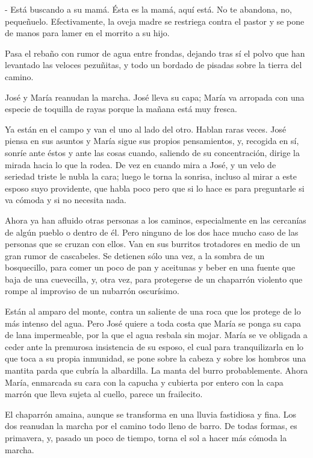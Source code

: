 \documentclass[12pt, twoside, openright]{book} %
\begin{document}
- Está buscando a su mamá. Ésta es la mamá, aquí está. No te abandona, no, pequeñuelo. Efectivamente, la oveja madre se restriega contra el pastor y se pone de manos para lamer en el morrito a su hijo. 

Pasa el rebaño con rumor de agua entre frondas, dejando tras sí el polvo que han levantado las veloces pezuñitas, y todo un bordado de pisadas sobre la tierra del camino. 

José y María reanudan la marcha. José lleva su capa; María va arropada con una especie de toquilla de rayas porque la mañana está muy fresca. 

Ya están en el campo y van el uno al lado del otro. Hablan raras veces. José piensa en sus asuntos y María sigue sus propios pensamientos, y, recogida en sí, sonríe ante éstos y ante las cosas cuando, saliendo de su concentración, dirige la mirada hacia lo que la rodea. De vez en cuando mira a José, y un velo de seriedad triste le nubla la cara; luego le torna la sonrisa, incluso al mirar a este esposo suyo providente, que habla poco pero que si lo hace es para preguntarle si va cómoda y si no necesita nada. 

Ahora ya han afluido otras personas a los caminos, especialmente en las cercanías de algún pueblo o dentro de él. Pero ninguno de los dos hace mucho caso de las personas que se cruzan con ellos. Van en sus burritos trotadores en medio de un gran rumor de cascabeles. Se detienen sólo una vez, a la sombra de un bosquecillo, para comer un poco de pan y aceitunas y beber en una fuente que baja de una cuevecilla, y, otra vez, para protegerse de un chaparrón violento que rompe al improviso de un nubarrón oscurísimo. 

Están al amparo del monte, contra un saliente de una roca que los protege de lo más intenso del agua. Pero José quiere a toda costa que María se ponga su capa de lana impermeable, por la que el agua resbala sin mojar. María se ve obligada a ceder ante la premurosa insistencia de su esposo, el cual para tranquilizarla en lo que toca a su propia inmunidad, se pone sobre la cabeza y sobre los hombros una mantita parda que cubría la albardilla. La manta del burro probablemente. Ahora María, enmarcada su cara con la capucha y cubierta por entero con la capa marrón que lleva sujeta al cuello, parece un frailecito. 

El chaparrón amaina, aunque se transforma en una lluvia fastidiosa y fina. Los dos reanudan la marcha por el camino todo lleno de barro. De todas formas, es primavera, y, pasado un poco de tiempo, torna el sol a hacer más cómoda la marcha. 
\end{document}
